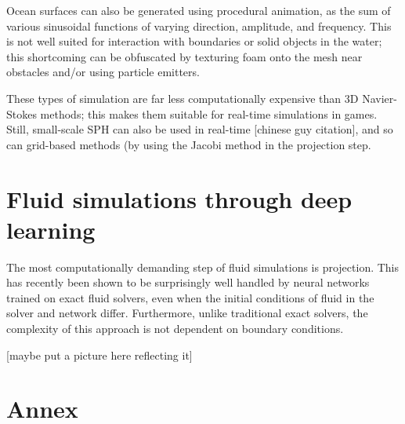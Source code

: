 \documentclass[12pt]{article}
\begin{document}
Ocean surfaces can also be generated using procedural animation, as the sum of various sinusoidal functions of varying direction, amplitude, and frequency. This is not well suited for interaction with boundaries or solid objects in the water; this shortcoming can be obfuscated by texturing foam onto the mesh near obstacles and/or using particle emitters.

These types of simulation are far less computationally expensive than 3D Navier-Stokes methods; this makes them suitable for real-time simulations in games. Still, small-scale SPH can also be used in real-time [chinese guy citation], and so can grid-based methods (by using the Jacobi method in the projection step.

\section{Fluid simulations through deep learning}

The most computationally demanding step of fluid simulations is projection. This has recently been shown to be surprisingly well handled by neural networks trained on exact fluid solvers, even when the initial conditions of fluid in the solver and network differ. Furthermore, unlike traditional exact solvers, the complexity of this approach is not dependent on boundary conditions.

[maybe put a picture here reflecting it]

\section*{Annex}
\renewcommand{\thefigure}{A\arabic{figure}}

\setcounter{figure}{0}
\end{document}
